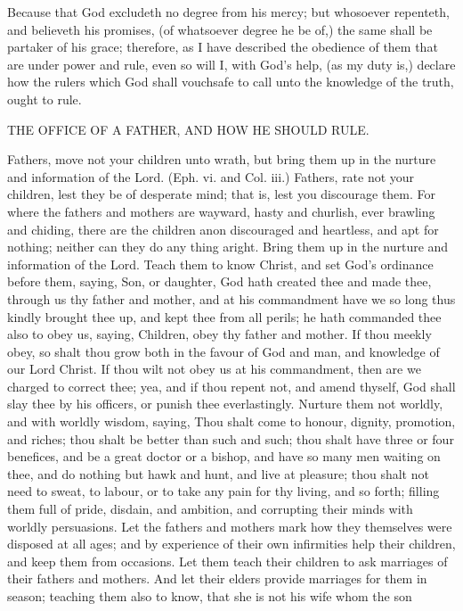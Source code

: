Because that God excludeth no degree from his 
mercy; but whosoever repenteth, and believeth his promises,
(of whatsoever degree he be of,) the same shall be 
partaker of his grace; therefore, as I have described the 
obedience of them that are under power and rule, even so 
will I, with God's help, (as my duty is,) declare how the 
rulers which God shall vouchsafe to call unto the knowledge
of the truth, ought to rule. 


THE OFFICE OF A FATHER, AND HOW HE 
SHOULD RULE. 

Fathers, move not your children unto wrath, but 
bring them up in the nurture and information of the 
Lord. (Eph. vi. and Col. iii.) Fathers, rate not your 
children, lest they be of desperate mind; that is, lest you 
discourage them. For where the fathers and mothers are 
wayward, hasty and churlish, ever brawling and chiding, 
there are the children anon discouraged and heartless, and 
apt for nothing; neither can they do any thing aright. 
Bring them up in the nurture and information of the 
Lord. Teach them to know Christ, and set God's ordinance
before them, saying, Son, or daughter, God hath 
created thee and made thee, through us thy father and 
mother, and at his commandment have we so long thus
kindly brought thee up, and kept thee from all perils; he 
hath commanded thee also to obey us, saying, Children,
obey thy father and mother. If thou meekly obey, so 
shalt thou grow both in the favour of God and man, and 
knowledge of our Lord Christ. If thou wilt not obey us 
at his commandment, then are we charged to correct thee;
yea, and if thou repent not, and amend thyself, God shall 
slay thee by his officers, or punish thee everlastingly. 
Nurture them not worldly, and with worldly wisdom, 
saying, Thou shalt come to honour, dignity, promotion, 
and riches; thou shalt be better than such and such; thou 
shalt have three or four benefices, and be a great doctor or 
a bishop, and have so many men waiting on thee, and do 
nothing but hawk and hunt, and live at pleasure; thou 
shalt not need to sweat, to labour, or to take any pain for 
thy living, and so forth; filling them full of pride, disdain,
and ambition, and corrupting their minds with worldly 
persuasions. Let the fathers and mothers mark how they 
themselves were disposed at all ages; and by experience 
of their own infirmities help their children, and keep 
them from occasions. Let them teach their children to 
ask marriages of their fathers and mothers. And let their 
elders provide marriages for them in season; teaching 
them also to know, that she is not his wife whom the son 
